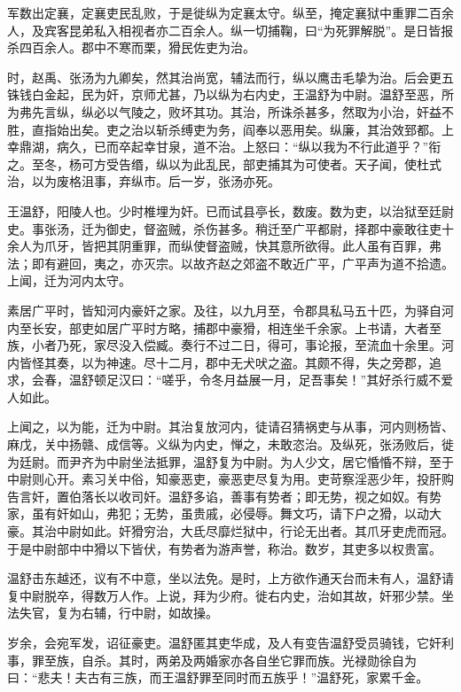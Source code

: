 \documentclass[12pt,UTF8]{ctexbook}
\begin{document}
军数出定襄，定襄吏民乱败，于是徙纵为定襄太守。纵至，掩定襄狱中重罪二百余人，及宾客昆弟私入相视者亦二百余人。纵一切捕鞠，曰“为死罪解脱”。是日皆报杀四百余人。郡中不寒而栗，猾民佐吏为治。



时，赵禹、张汤为九卿矣，然其治尚宽，辅法而行，纵以鹰击毛挚为治。后会更五铢钱白金起，民为奸，京师尤甚，乃以纵为右内史，王温舒为中尉。温舒至恶，所为弗先言纵，纵必以气陵之，败坏其功。其治，所诛杀甚多，然取为小治，奸益不胜，直指始出矣。吏之治以斩杀缚吏为务，阎奉以恶用矣。纵廉，其治效郅都。上幸鼎湖，病久，已而卒起幸甘泉，道不治。上怒曰：“纵以我为不行此道乎？”衔之。至冬，杨可方受告缗，纵以为此乱民，部吏捕其为可使者。天子闻，使杜式治，以为废格沮事，弃纵市。后一岁，张汤亦死。



王温舒，阳陵人也。少时椎埋为奸。已而试县亭长，数废。数为吏，以治狱至廷尉史。事张汤，迁为御史，督盗贼，杀伤甚多。稍迁至广平都尉，择郡中豪敢往吏十余人为爪牙，皆把其阴重罪，而纵使督盗贼，快其意所欲得。此人虽有百罪，弗法；即有避回，夷之，亦灭宗。以故齐赵之郊盗不敢近广平，广平声为道不拾遗。上闻，迁为河内太守。



素居广平时，皆知河内豪奸之家。及往，以九月至，令郡具私马五十匹，为驿自河内至长安，部吏如居广平时方略，捕郡中豪猾，相连坐千余家。上书请，大者至族，小者乃死，家尽没入偿臧。奏行不过二日，得可，事论报，至流血十余里。河内皆怪其奏，以为神速。尽十二月，郡中无犬吠之盗。其颇不得，失之旁郡，追求，会春，温舒顿足汉曰：“嗟乎，令冬月益展一月，足吾事矣！”其好杀行威不爱人如此。



上闻之，以为能，迁为中尉。其治复放河内，徒请召猜祸吏与从事，河内则杨皆、麻戊，关中扬赣、成信等。义纵为内史，惮之，未敢恣治。及纵死，张汤败后，徙为廷尉。而尹齐为中尉坐法抵罪，温舒复为中尉。为人少文，居它惛惛不辩，至于中尉则心开。素习关中俗，知豪恶吏，豪恶吏尽复为用。吏苛察淫恶少年，投肝购告言奸，置伯落长以收司奸。温舒多谄，善事有势者；即无势，视之如奴。有势家，虽有奸如山，弗犯；无势，虽贵戚，必侵辱。舞文巧，请下户之猾，以动大豪。其治中尉如此。奸猾穷治，大氐尽靡烂狱中，行论无出者。其爪牙吏虎而冠。于是中尉部中中猾以下皆伏，有势者为游声誉，称治。数岁，其吏多以权贵富。



温舒击东越还，议有不中意，坐以法免。是时，上方欲作通天台而未有人，温舒请复中尉脱卒，得数万人作。上说，拜为少府。徙右内史，治如其故，奸邪少禁。坐法失官，复为右辅，行中尉，如故操。



岁余，会宛军发，诏征豪吏。温舒匿其吏华成，及人有变告温舒受员骑钱，它奸利事，罪至族，自杀。其时，两弟及两婚家亦各自坐它罪而族。光禄勋徐自为曰：“悲夫！夫古有三族，而王温舒罪至同时而五族乎！”温舒死，家累千金。
\end{document}
